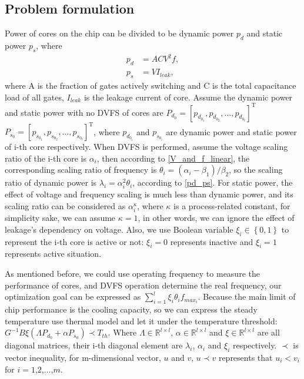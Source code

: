 \subsection{Problem formulation}
Power of cores on the chip can be divided to be dynamic power $p_d$ and static power $p_s$, where
\begin{equation}\label{pd_ps}
\begin{split}
p_d&=A C V^2 f, \\
p_s&=V I_{leak},
\end{split}
\end{equation}
where A is the fraction of gates actively switching and C is the total capacitance load of all gates, $I_{leak}$ is the leakage current of
core.
Assume the dynamic power and static power with no DVFS of cores are $P_{d_0}=[p_{d_{0_1}},p_{d_{0_2}},\ldots,p_{d_{0_l}}]^ \mathrm{ T }$
$P_{s_0}=[p_{s_{0_1}},p_{s_{0_2}},\ldots,p_{s_{0_l}}]^ \mathrm{ T }$, where $p_{d_{0_i}}$ and $p_{s_{0_i}}$ are dynamic power and static power
of i-th core respectively. When DVFS is performed, assume the voltage scaling ratio of the i-th core is $\alpha_i$, then according to \eqref{V_and_f_linear},
the corresponding scaling ratio of frequency is $\theta_i = (\alpha_i-\beta_1)/\beta_2$, so the scaling ratio of dynamic power is $\lambda_i=\alpha_i^2 \theta_i$, according
to \eqref{pd_ps}. For static power, the effect of voltage and frequency scaling is much less than dynamic power, and its scaling ratio can be considered
as $\alpha_i^\kappa$, where $\kappa$ is a process-related constant, for simplicity sake, we can assume $\kappa=1$, in other words, we can ignore
the effect of leakage's dependency on voltage. Also, we use Boolean variable $\xi_i \in \left\{0,1\right\}$ to represent the i-th core is active or
not: $\xi_i=0$ represents inactive and $\xi_i=1$ represents active situation.

As mentioned before, we could use operating frequency to measure the performance of cores, and DVFS operation determine the real frequency, our
optimization goal can be expressed as $\sum_{i=1}^l \xi_i \theta_i f_{max_i}$. Because the main limit of chip performance is the cooling capacity,
so we can express the steady temperature use thermal model and let it under the temperature threshold:
$G^{-1} B \xi \left( \Lambda P_{d_0} + \alpha P_{s_0} \right) \prec T_{th}$.
Where $\Lambda \in \mathbb{R}^{l \times l} $, $\alpha \in \mathbb{R}^{l \times l} $ and $\xi \in \mathbb{R}^{l \times l}$ are all diagonal matrices,
their i-th diagonal element are $\lambda_i$, $\alpha_i$ and $\xi_i$ respectively. $\prec$ is vector inequality, for m-dimensional vector, $u$ and $v$,
$u \prec v$ represents that $u_i < v_i$ for $i = 1$,$2$,$\ldots$,$m$.

